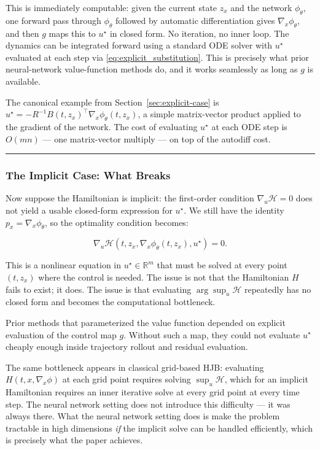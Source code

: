 \documentclass{article}
\begin{document}
This is immediately computable: given the current state $z_x$ and the network
$\phi_\theta$, one forward pass through $\phi_\theta$ followed by
automatic differentiation gives $\nabla_x \phi_\theta$, and then $g$ maps this
to $u^\star$ in closed form. No iteration, no inner loop. The dynamics can be
integrated forward using a standard ODE solver with $u^\star$ evaluated at each
step via \eqref{eq:explicit_substitution}. This is precisely what prior
neural-network value-function methods do, and it works seamlessly as long as
$g$ is available.

The canonical example from Section~\ref{sec:explicit-case} is $u^\star = -R^{-1} B(t,z_x)^\top
\nabla_x \phi_\theta(t, z_x)$, a simple matrix-vector product applied to the
gradient of the network. The cost of evaluating $u^\star$ at each ODE step is
$O(mn)$ --- one matrix-vector multiply --- on top of the autodiff cost.

\medskip\hrule\medskip

\subsubsection{The Implicit Case: What Breaks}

Now suppose the Hamiltonian is implicit: the first-order condition
$\nabla_u \mathcal{H} = 0$ does not yield a usable closed-form expression for
$u^\star$. We still have the identity $p_x = \nabla_x \phi_\theta$, so the
optimality condition becomes:

\begin{equation}
    \nabla_u \mathcal{H}(t, z_x, \nabla_x \phi_\theta(t, z_x), u^\star) = 0.
    \label{eq:implicit_condition}
\end{equation}

This is a nonlinear equation in $u^\star \in \mathbb{R}^m$ that must be solved
at every point $(t, z_x)$ where the control is needed. The issue is not that
the Hamiltonian $H$ fails to exist; it does. The issue is that evaluating
$\arg\sup_u \mathcal{H}$ repeatedly has no closed form and becomes the
computational bottleneck.

Prior methods that parameterized the value function depended on explicit
evaluation of the control map $g$. Without such a map, they could not evaluate
$u^\star$ cheaply enough inside trajectory rollout and residual evaluation.

The same bottleneck appears in classical grid-based HJB:
evaluating $H(t, x, \nabla_x\phi)$ at each grid point requires solving
$\sup_u \mathcal{H}$, which for an implicit Hamiltonian requires an inner
iterative solve at every grid point at every time step. The neural network
setting does not introduce this difficulty --- it was always there. What the
neural network setting does is make the problem tractable in high dimensions
\textit{if} the implicit solve can be handled efficiently, which is precisely
what the paper achieves.
\end{document}

